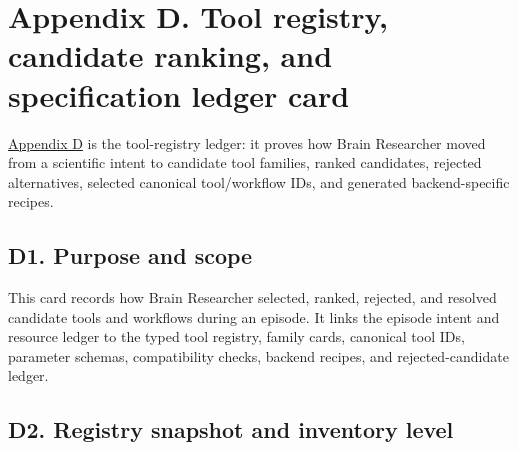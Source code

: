\section{\texorpdfstring{\textbf{Appendix D. Tool registry, candidate ranking, and specification ledger card}}{Appendix D. Tool registry, candidate ranking, and specification ledger card}}\label{appendix-d.-tool-registry-candidate-ranking-and-specification-ledger-card}\label{app:d}

\hyperref[app:d]{Appendix D} is the tool-registry ledger: it proves how Brain Researcher moved from a scientific intent to candidate tool families, ranked candidates, rejected alternatives, selected canonical tool/\allowbreak{}workflow IDs, and generated backend-specific recipes.

\subsection{\texorpdfstring{\textbf{D1. Purpose and scope}}{D1. Purpose and scope}}\label{d1.-purpose-and-scope}

This card records how Brain Researcher selected, ranked, rejected, and resolved candidate tools and workflows during an episode. It links the episode intent and resource ledger to the typed tool registry, family cards, canonical tool IDs, parameter schemas, compatibility checks, backend recipes, and rejected-candidate ledger.

\subsection{\texorpdfstring{\textbf{D2. Registry snapshot and inventory level}}{D2. Registry snapshot and inventory level}}\label{d2.-registry-snapshot-and-inventory-level}

